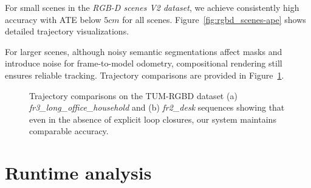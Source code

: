 For small scenes in the \textit{RGB-D scenes V2 dataset}, we achieve consistently high accuracy with ATE below $5cm$ for all scenes. Figure~\ref{fig:rgbd_scenes-ape} shows detailed trajectory visualizations.

For larger scenes, although noisy semantic segmentations affect masks and introduce noise for frame-to-model odometry, compositional rendering still ensures reliable tracking. Trajectory comparisons are provided in Figure~\ref{fig:fr3_household-ape}.


\begin{figure}[t!]
    \centering
    \caption{Trajectory comparisons on the TUM-RGBD dataset (a) \emph{fr3\_long\_office\_household} and (b) \emph{fr2\_desk} sequences showing that even in the absence of explicit loop closures, our system maintains comparable accuracy.}
    \vspace*{-1em}
    \label{fig:fr3_household-ape}
\end{figure}
\section{Runtime analysis}

